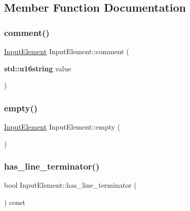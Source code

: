 \subsection{Member Function Documentation}
\mbox{\label{class_input_element_a8a42a85aa10d7f3b40ea662402880a5a}} 
\subsubsection{\texorpdfstring{comment()}{comment()}}
{\footnotesize\ttfamily \hyperlink{class_input_element}{Input\+Element} Input\+Element\+::comment (\begin{DoxyParamCaption}\item[{\textbf{ std\+::u16string}}]{value }\end{DoxyParamCaption})\hspace{0.3cm}{\ttfamily [static]}}

\mbox{\label{class_input_element_aa6f769b2be5ea1b25e5cdb37235e23c9}} 
\subsubsection{\texorpdfstring{empty()}{empty()}}
{\footnotesize\ttfamily \hyperlink{class_input_element}{Input\+Element} Input\+Element\+::empty (\begin{DoxyParamCaption}{ }\end{DoxyParamCaption})\hspace{0.3cm}{\ttfamily [static]}}

\mbox{\label{class_input_element_aba40c84ff7da5ede181b2109778fb02c}} 
\subsubsection{\texorpdfstring{has\+\_\+line\+\_\+terminator()}{has\_line\_terminator()}}
{\footnotesize\ttfamily bool Input\+Element\+::has\+\_\+line\+\_\+terminator (\begin{DoxyParamCaption}{ }\end{DoxyParamCaption}) const}

